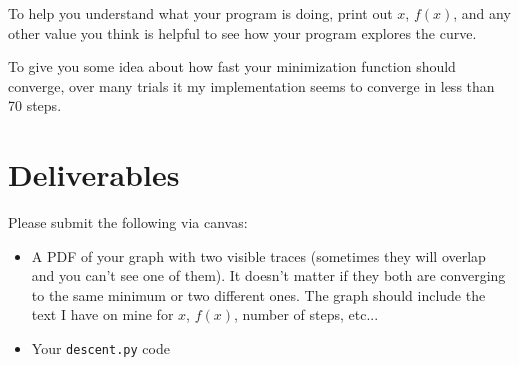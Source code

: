\begin{fullwidth}
To help you understand what your program is doing, print out $x$, $f(x)$, and any other value you think is helpful to see how your program explores the curve.

To give you some idea about  how fast your minimization function should converge, over many trials it my implementation seems to converge in less than 70 steps.
 
\section{Deliverables}

Please submit the following via canvas:
 
\begin{itemize}
\item A PDF of your graph with two visible traces (sometimes they will overlap and you can't see one of them).  It doesn't matter if they both are converging to the same minimum or two different ones. The graph should include the text I have on mine for $x$, $f(x)$, number of steps, etc...
\item Your {\tt descent.py} code
\end{itemize}

\end{fullwidth}

